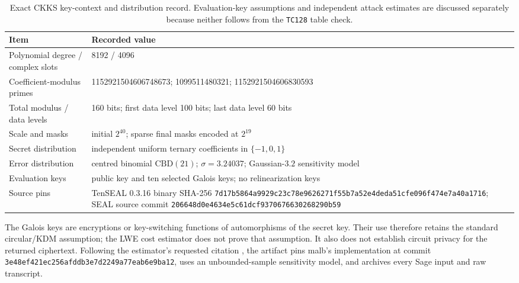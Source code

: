 \documentclass[pdflatex,sn-basic,Numbered]{sn-jnl}
\theoremstyle{plain}
\begin{document}
\begin{table}[t]
\caption{Exact CKKS key-context and distribution record. Evaluation-key assumptions and independent attack estimates are discussed separately because neither follows from the \texttt{TC128} table check.}\label{tab:ckks-parameters}
\centering
\small
\begin{tabularx}{\textwidth}{@{}lY@{}}
\toprule
Item & Recorded value \\
\midrule
Polynomial degree / complex slots & 8192 / 4096 \\
Coefficient-modulus primes & 1152921504606748673; 1099511480321; 1152921504606830593 \\
Total modulus / data levels & 160 bits; first data level 100 bits; last data level 60 bits \\
Scale and masks & initial $2^{40}$; sparse final masks encoded at $2^{19}$ \\
Secret distribution & independent uniform ternary coefficients in $\{-1,0,1\}$ \\
Error distribution & centred binomial $\mathrm{CBD}(21)$; $\sigma=3.24037$; Gaussian-$3.2$ sensitivity model \\
Evaluation keys & public key and ten selected Galois keys; no relinearization keys \\
Source pins & TenSEAL 0.3.16 binary SHA-256 \nolinkurl{7d17b5864a9929c23c78e9626271f55b7a52e4deda51cfe096f474e7a40a1716}; SEAL source commit \nolinkurl{206648d0e4634e5c61dcf9370676630268290b59} \\
\bottomrule
\end{tabularx}
\end{table}

The Galois keys are encryptions or key-switching functions of automorphisms of the secret key. Their use therefore retains the standard circular/KDM assumption; the LWE cost estimator does not prove that assumption. It also does not establish circuit privacy for the returned ciphertext. Following the estimator's requested citation \cite{Albrecht2015LWEHardness}, the artifact pins malb's implementation at commit \nolinkurl{3e48ef421ec256afddb3e7d2249a77eab6e9ba12}, uses an unbounded-sample sensitivity model, and archives every Sage input and raw transcript.
\end{document}
